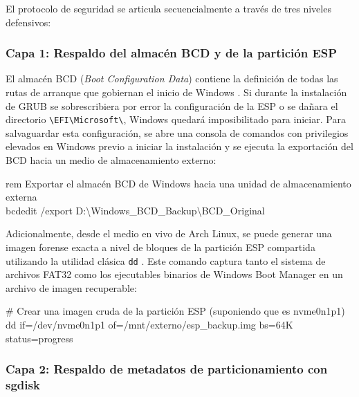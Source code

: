 \documentclass[12pt]{article}
\begin{document}
El protocolo de seguridad se articula secuencialmente a través de tres niveles defensivos:

\subsubsection{Capa 1: Respaldo del almacén BCD y de la partición ESP}

El almacén BCD (\textit{Boot Configuration Data}) contiene la definición de todas las rutas de arranque que gobiernan el inicio de Windows \parencite{microsoft2024bcdedit}. Si durante la instalación de GRUB se sobrescribiera por error la configuración de la ESP o se dañara el directorio \texttt{\textbackslash EFI\textbackslash Microsoft\textbackslash}, Windows quedará imposibilitado para iniciar. Para salvaguardar esta configuración, se abre una consola de comandos con privilegios elevados en Windows previo a iniciar la instalación y se ejecuta la exportación del BCD hacia un medio de almacenamiento externo:

\begin{mdframed}[style=terminal]
\ttfamily\upshape\color{bashLetterColor}\footnotesize
rem Exportar el almacén BCD de Windows hacia una unidad de almacenamiento externa \\
bcdedit /export D:\textbackslash Windows\_BCD\_Backup\textbackslash BCD\_Original
\end{mdframed}

Adicionalmente, desde el medio en vivo de Arch Linux, se puede generar una imagen forense exacta a nivel de bloques de la partición ESP compartida utilizando la utilidad clásica \texttt{dd} \parencite[\S 11.7, pp.\ 532--535]{stallings2018operating}. Este comando captura tanto el sistema de archivos FAT32 como los ejecutables binarios de Windows Boot Manager en un archivo de imagen recuperable:

\begin{mdframed}[style=terminal]
\ttfamily\upshape\color{bashLetterColor}\footnotesize
\# Crear una imagen cruda de la partición ESP (suponiendo que es nvme0n1p1) \\
dd if=/dev/nvme0n1p1 of=/mnt/externo/esp\_backup.img bs=64K status=progress
\end{mdframed}

\subsubsection{Capa 2: Respaldo de metadatos de particionamiento con sgdisk}
\end{document}

